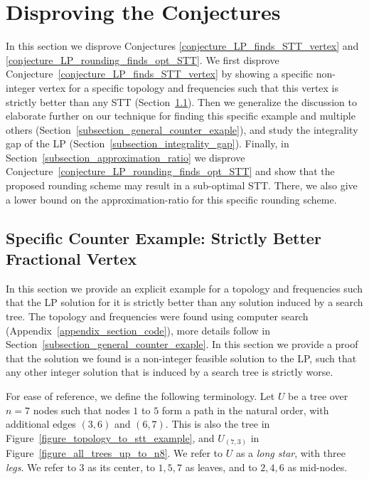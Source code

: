 \section{Disproving the Conjectures}
\label{section_counter_example_main_polytope_study_disproving_conjecture}
In this section we disprove Conjectures \ref{conjecture_LP_finds_STT_vertex} and \ref{conjecture_LP_rounding_finds_opt_STT}. We first disprove Conjecture~\ref{conjecture_LP_finds_STT_vertex} by showing a specific non-integer vertex for a specific topology and frequencies such that this vertex is strictly better than any STT (Section~\ref{subsection_specific_counter_example}). Then we generalize the discussion to elaborate further on our technique for finding this specific example and multiple others (Section~\ref{subsection_general_counter_exaple}), and study the integrality gap of the LP (Section~\ref{subsection_integrality_gap}). Finally, in Section~\ref{subsection_approximation_ratio} we disprove Conjecture~\ref{conjecture_LP_rounding_finds_opt_STT} and show that the proposed rounding scheme may result in a sub-optimal STT. There, we also  give a lower bound on the approximation-ratio for this specific rounding scheme.

\subsection{Specific Counter Example: Strictly Better Fractional Vertex}
\label{subsection_specific_counter_example}

In this section we provide an explicit example for a topology and frequencies such that the LP solution for it is strictly better than any solution induced by a search tree. The topology and frequencies were found using computer search (Appendix~\ref{appendix_section_code}), more details follow in Section~\ref{subsection_general_counter_exaple}. 
In this section we provide
a proof that the solution we found 
is a non-integer feasible solution to the LP, such that any other integer solution that is induced by a search tree is strictly worse.


\begin{definition}[Terminology]
\label{definition_long_star}
For ease of reference, we define the following terminology. Let $U$ be a tree over $n=7$ nodes such that nodes $1$ to $5$ form a path in the natural order, with additional edges $(3,6)$ and $(6,7)$. This is also the tree in Figure~\ref{figure_topology_to_stt_example}, and $U_{(7,3)}$ in Figure~\ref{figure_all_trees_up_to_n8}. We refer to $U$ as a \emph{long star}, with three \emph{legs}. We refer to $3$ as its center, to $1,5,7$ as leaves, and to $2,4,6$ as mid-nodes.
\end{definition}

